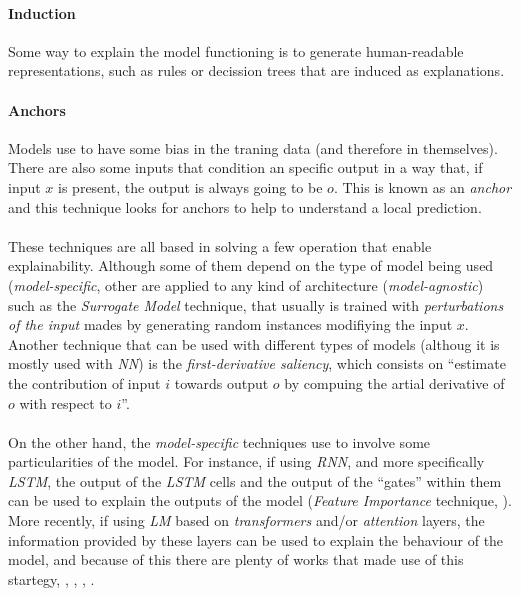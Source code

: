	\paragraph{Induction} Some way to explain the model functioning is to generate human-readable representations, such as rules or decission trees that are induced as explanations.
	\paragraph{Anchors} Models use to have some bias in the traning data (and therefore in themselves). There are also some inputs that condition an specific output in a way that, if input $x$ is present, the output is always going to be $o$. This is known as an \emph{anchor} and this technique looks for anchors to help to understand a local prediction.
\paragraph{}
These techniques are all based in solving a few operation that enable explainability. Although some of them depend on the type of model being used (\emph{model-specific}, other are applied to any kind of architecture (\emph{model-agnostic}) such as the \emph{Surrogate Model} technique, that usually is trained with \emph{perturbations of the input}\cite{Ribeiro2016} mades by generating random instances modifiying the input $x$. Another technique that can be used with different types of models (althoug it is mostly used with \emph{NN}) is the \emph{first-derivative saliency}, which consists on ``estimate the contribution of input $i$ towards output $o$ by compuing the artial derivative of $o$ with respect to $i$''.\cite{Danilevsky2020}
\paragraph{}
On the other hand, the \emph{model-specific} techniques use to involve some particularities of the model. For instance, if using \emph{RNN}, and more specifically \emph{LSTM}, the output of the \emph{LSTM} cells and the output of the ``gates'' within them can be used to explain the outputs of the model (\emph{Feature Importance} technique, \cite{Ghaeini2018}). More recently, if using \emph{LM} based on \emph{transformers} and/or \emph{attention} layers, the information provided by these layers can be used to explain the behaviour of the model, and because of this there are plenty of works that made use of this startegy, \cite{Luo2018}, \cite{Xie2017}, \cite{Serrano2019}, \cite{Jain2019}.
